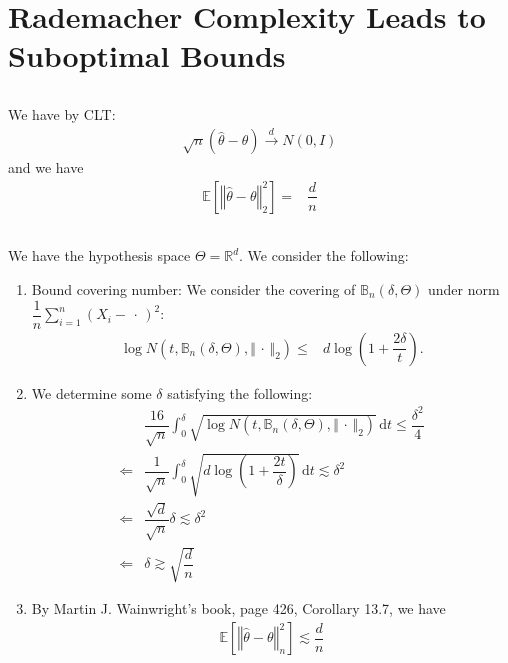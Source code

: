 \documentclass[11pt,a4paper]{ctexart}
\numberwithin{equation}{section}%
\begin{document}
\section{Rademacher Complexity Leads to Suboptimal Bounds}

\subsection{}

We have by CLT:
\begin{align*}
    \sqrt{n} (\hat{\theta }-\theta ) \xrightarrow{d} N(0,I)
\end{align*}
and we have
\begin{align*}
    \mathbb{E}\left[ \left\Vert \hat{\theta }-\theta  \right\Vert _2^2  \right]  =& \dfrac{ d }{ n } 
\end{align*}



\subsection{}

We have the hypothesis space $ \Theta = \mathbb{R}^d $. We consider the following:
\begin{enumerate}[topsep=2pt,itemsep=2pt]
    \item Bound covering number: We consider the covering of $ \mathbb{B}_n(\delta , \Theta) $ under norm $ \dfrac{ 1 }{ n }\sum_{i=1}^n (X_i - \, \cdot \, )^2  $:
    \begin{align*}
        \log N(t , \mathbb{B}_n(\delta , \Theta), \left\Vert \, \cdot \,  \right\Vert _2) \leq & d\log (1 + \dfrac{ 2\delta  }{ t } ).
    \end{align*}
    \item We determine some $ \delta  $ satisfying the following:
    \begin{align*}
        &\dfrac{ 16 }{ \sqrt{n} }\int_0^{\delta } \sqrt{\log N(t , \mathbb{B}_n(\delta , \Theta), \left\Vert \, \cdot \,  \right\Vert _2) } \,\mathrm{d}t \leq \dfrac{ \delta ^2 }{ 4 } \\
        \Leftarrow& \dfrac{ 1 }{ \sqrt{n} }\int_0^{\delta } \sqrt{d\log (1 + \dfrac{ 2t }{ \delta  } ) } \,\mathrm{d}t \lesssim \delta ^2\\
        \Leftarrow& \dfrac{ \sqrt{d} }{ \sqrt{n} }\delta \lesssim \delta ^2\\
        \Leftarrow& \delta \gtrsim \sqrt{\dfrac{ d }{ n } }
    \end{align*}
    \item By Martin J. Wainwright's book, page 426, Corollary 13.7, we have
    \begin{align*}
        \mathbb{E}\left[ \left\Vert \hat{\theta } - \theta  \right\Vert _n^2 \right]  \lesssim \dfrac{ d }{ n }
    \end{align*}

\end{enumerate}
\end{document}
